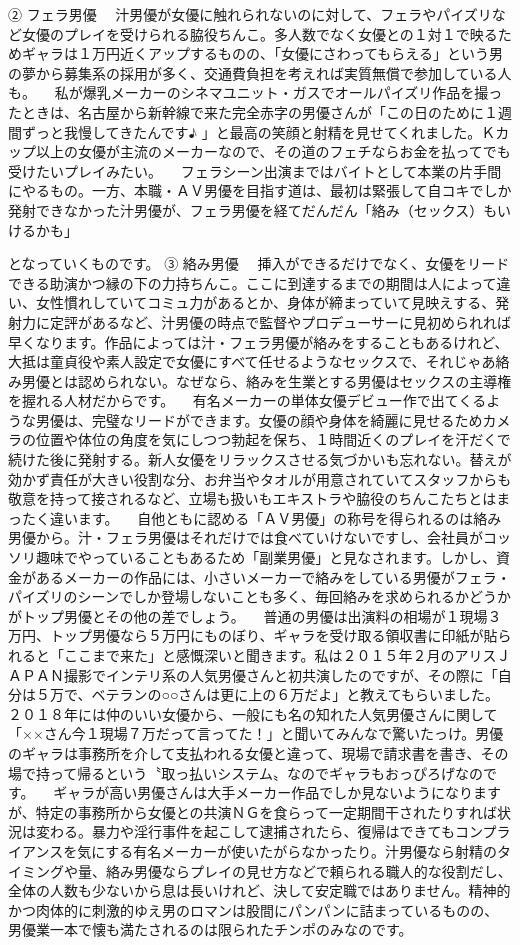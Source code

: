 \documentclass[12pt,UTF8]{ctexbook}
\begin{document}
②
 フェラ男優
　汁男優が女優に触れられないのに対して、フェラやパイズリなど女優のプレイを受けられる脇役ちんこ。多人数でなく女優との１対１で映るためギャラは１万円近くアップするものの、「女優にさわってもらえる」という男の夢から募集系の採用が多く、交通費負担を考えれば実質無償で参加している人も。
　私が爆乳メーカーのシネマユニット・ガスでオールパイズリ作品を撮ったときは、名古屋から新幹線で来た完全赤字の男優さんが「この日のために１週間ずっと我慢してきたんです♪
 」と最高の笑顔と射精を見せてくれました。Ｋカップ以上の女優が主流のメーカーなので、その道のフェチならお金を払ってでも受けたいプレイみたい。
　フェラシーン出演まではバイトとして本業の片手間にやるもの。一方、本職・ＡＶ男優を目指す道は、最初は緊張して自コキでしか発射できなかった汁男優が、フェラ男優を経てだんだん「絡み（セックス）もいけるかも」

となっていくものです。
③
 絡み男優
　挿入ができるだけでなく、女優をリードできる助演かつ縁の下の力持ちんこ。ここに到達するまでの期間は人によって違い、女性慣れしていてコミュ力があるとか、身体が締まっていて見映えする、発射力に定評があるなど、汁男優の時点で監督やプロデューサーに見初められれば早くなります。作品によっては汁・フェラ男優が絡みをすることもあるけれど、大抵は童貞役や素人設定で女優にすべて任せるようなセックスで、それじゃあ絡み男優とは認められない。なぜなら、絡みを生業とする男優はセックスの主導権を握れる人材だからです。
　有名メーカーの単体女優デビュー作で出てくるような男優は、完璧なリードができます。女優の顔や身体を綺麗に見せるためカメラの位置や体位の角度を気にしつつ勃起を保ち、１時間近くのプレイを汗だくで続けた後に発射する。新人女優をリラックスさせる気づかいも忘れない。替えが効かず責任が大きい役割な分、お弁当やタオルが用意されていてスタッフからも敬意を持って接されるなど、立場も扱いもエキストラや脇役のちんこたちとはまったく違います。
　自他ともに認める「ＡＶ男優」の称号を得られるのは絡み男優から。汁・フェラ男優はそれだけでは食べていけないですし、会社員がコッソリ趣味でやっていることもあるため「副業男優」と見なされます。しかし、資金があるメーカーの作品には、小さいメーカーで絡みをしている男優がフェラ・パイズリのシーンでしか登場しないことも多く、毎回絡みを求められるかどうかがトップ男優とその他の差でしょう。
　普通の男優は出演料の相場が１現場３万円、トップ男優なら５万円にものぼり、ギャラを受け取る領収書に印紙が貼られると「ここまで来た」と感慨深いと聞きます。私は２０１５年２月のアリスＪＡＰＡＮ撮影でインテリ系の人気男優さんと初共演したのですが、その際に「自分は５万で、ベテランの○○さんは更に上の６万だよ」と教えてもらいました。２０１８年には仲のいい女優から、一般にも名の知れた人気男優さんに関して「××さん今１現場７万だって言ってた！」と聞いてみんなで驚いたっけ。男優のギャラは事務所を介して支払われる女優と違って、現場で請求書を書き、その場で持って帰るという〝取っ払いシステム〟なのでギャラもおっぴろげなのです。
　ギャラが高い男優さんは大手メーカー作品でしか見ないようになりますが、特定の事務所から女優との共演ＮＧを食らって一定期間干されたりすれば状況は変わる。暴力や淫行事件を起こして逮捕されたら、復帰はできてもコンプライアンスを気にする有名メーカーが使いたがらなかったり。汁男優なら射精のタイミングや量、絡み男優ならプレイの見せ方などで頼られる職人的な役割だし、全体の人数も少ないから息は長いけれど、決して安定職ではありません。精神的かつ肉体的に刺激的ゆえ男のロマンは股間にパンパンに詰まっているものの、男優業一本で懐も満たされるのは限られたチンポのみなのです。
\end{document}
